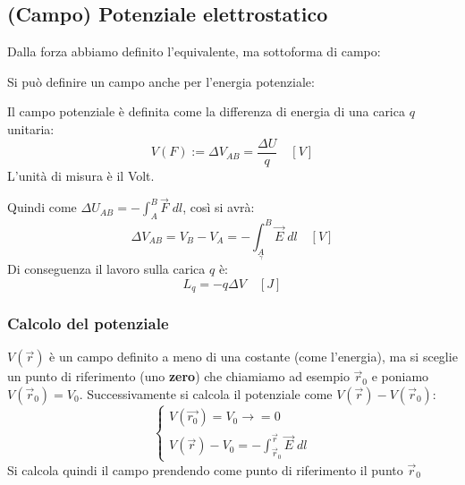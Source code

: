 \documentclass[a4paper]{article}
\begin{document}
\subsection{(Campo) Potenziale elettrostatico}
Dalla forza abbiamo definito l'equivalente, ma sottoforma di campo:
\begin{figure}[H]
  \centering
\end{figure}
\noindent
Si può definire un campo anche per l'energia potenziale:
\begin{figure}[H]
  \centering
\end{figure}

\begin{definition}
  Il campo potenziale è definita come la differenza di energia di una carica \( q \) 
  unitaria:
  \[
    V(F) := \Delta V_{AB} = \frac{\Delta U}{q} \quad \left[ V \right]
  \] 
  L'unità di misura è il Volt.

  \vspace{1em}
  \noindent
  Quindi come \( \Delta U_{AB} = - \int_A^B \vec{F} \; dl \), così si avrà:
  \[
    \Delta V_{AB} = V_B - V_A = - \int_{\underset{\gamma}{A}}^B \vec{E} \; dl \quad \left[ V \right]
  \] 
  Di conseguenza il lavoro sulla carica \( q \) è:
  \[
    L_q = - q \Delta V \quad \left[ J \right]
  \] 
\end{definition}

\subsubsection{Calcolo del potenziale}
\( V(\vec{r}) \) è un campo definito a meno di una costante (come l'energia), ma si
sceglie un punto di riferimento (uno \textbf{zero}) che chiamiamo ad esempio \( \vec{r}_0 \)
e poniamo \( V(\vec{r}_0) = V_0 \). Successivamente si calcola il potenziale come
\( V(\vec{r}) - V(\vec{r}_0)\):
\[
\begin{cases}
  V(\vec{r_0}) = V_0 \to = 0\\
  V(\vec{r}) - V_0 = - \int_{\vec{r}_0}^{\vec{r}} \vec{E} \; dl
\end{cases}
\] 
Si calcola quindi il campo prendendo come punto di riferimento il punto \( \vec{r}_0 \) 
\end{document}

